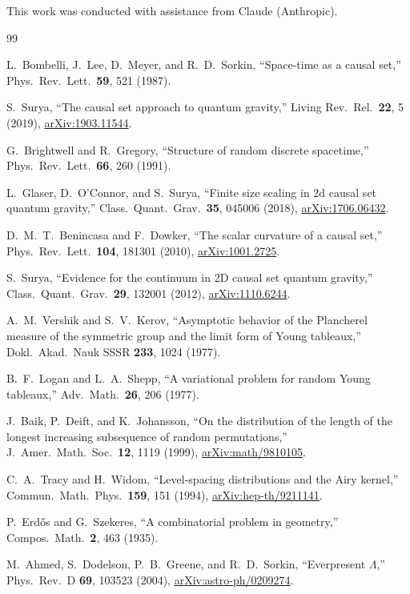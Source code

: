 \documentclass[aps,prd,twocolumn,superscriptaddress,nofootinbib]{revtex4-2}
\begin{document}
\begin{acknowledgments}
This work was conducted with assistance from Claude (Anthropic).
\end{acknowledgments}

\begin{thebibliography}{99}

L.~Bombelli, J.~Lee, D.~Meyer, and R.~D.~Sorkin,
``Space-time as a causal set,''
Phys.\ Rev.\ Lett.\ \textbf{59}, 521 (1987).

S.~Surya,
``The causal set approach to quantum gravity,''
Living Rev.\ Rel.\ \textbf{22}, 5 (2019),
\href{https://arxiv.org/abs/1903.11544}{arXiv:1903.11544}.

G.~Brightwell and R.~Gregory,
``Structure of random discrete spacetime,''
Phys.\ Rev.\ Lett.\ \textbf{66}, 260 (1991).

L.~Glaser, D.~O'Connor, and S.~Surya,
``Finite size scaling in 2d causal set quantum gravity,''
Class.\ Quant.\ Grav.\ \textbf{35}, 045006 (2018),
\href{https://arxiv.org/abs/1706.06432}{arXiv:1706.06432}.

D.~M.~T.~Benincasa and F.~Dowker,
``The scalar curvature of a causal set,''
Phys.\ Rev.\ Lett.\ \textbf{104}, 181301 (2010),
\href{https://arxiv.org/abs/1001.2725}{arXiv:1001.2725}.

S.~Surya,
``Evidence for the continuum in 2D causal set quantum gravity,''
Class.\ Quant.\ Grav.\ \textbf{29}, 132001 (2012),
\href{https://arxiv.org/abs/1110.6244}{arXiv:1110.6244}.

A.~M.~Vershik and S.~V.~Kerov,
``Asymptotic behavior of the Plancherel measure of the symmetric group and the limit form of Young tableaux,''
Dokl.\ Akad.\ Nauk SSSR \textbf{233}, 1024 (1977).

B.~F.~Logan and L.~A.~Shepp,
``A variational problem for random Young tableaux,''
Adv.\ Math.\ \textbf{26}, 206 (1977).

J.~Baik, P.~Deift, and K.~Johansson,
``On the distribution of the length of the longest increasing subsequence of random permutations,''
J.\ Amer.\ Math.\ Soc.\ \textbf{12}, 1119 (1999),
\href{https://arxiv.org/abs/math/9810105}{arXiv:math/9810105}.

C.~A.~Tracy and H.~Widom,
``Level-spacing distributions and the Airy kernel,''
Commun.\ Math.\ Phys.\ \textbf{159}, 151 (1994),
\href{https://arxiv.org/abs/hep-th/9211141}{arXiv:hep-th/9211141}.

P.~Erd\H{o}s and G.~Szekeres,
``A combinatorial problem in geometry,''
Compos.\ Math.\ \textbf{2}, 463 (1935).

M.~Ahmed, S.~Dodelson, P.~B.~Greene, and R.~D.~Sorkin,
``Everpresent $\Lambda$,''
Phys.\ Rev.\ D \textbf{69}, 103523 (2004),
\href{https://arxiv.org/abs/astro-ph/0209274}{arXiv:astro-ph/0209274}.

\end{thebibliography}
\end{document}
